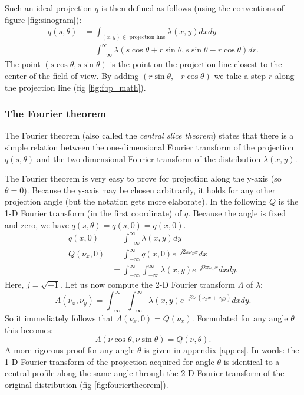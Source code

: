 \documentclass[11pt,oneside]{book}
\begin{document}
Such an ideal projection $q$ is then defined as follows (using the conventions
of figure \ref{fig:sinogram}):
\begin{align}
q(s, \theta) &= \int_{(x,y) \in \; \mbox{projection line}}
                  \lambda(x,y) dx dy\\
             &= \int_{-\infty}^{\infty}
        \lambda(s \cos \theta + r \sin \theta,
                s \sin \theta - r \cos \theta) dr. \label{eq:jnidealproj}
\end{align}
The point $(s \cos \theta, s \sin \theta)$ is the point on the projection line
closest to the center of the field of view.  By adding $(r \sin \theta, - r
\cos \theta)$ we take a step $r$ along the projection line (fig
\ref{fig:fbp_math}).


\subsubsection{The Fourier theorem}
The Fourier theorem (also called the {\em central slice theorem})
states that there is a simple relation between the one-dimensional
Fourier transform of the projection $q(s, \theta)$ and the
two-dimensional Fourier transform of the distribution $\lambda(x,y)$.

The Fourier theorem is very easy to prove for projection along the y-axis (so
$\theta = 0$). Because the y-axis may be chosen arbitrarily, it holds for
any other projection angle (but the notation gets more elaborate).
In the following $Q$ is the 1-D Fourier transform (in the first coordinate) of
$q$. Because the angle is fixed and zero, we have
$q(s, \theta) = q(s, 0) = q(x,0)$.
\begin{align}
  q(x,0) &= \int_{-\infty}^{\infty} \lambda(x,y) dy \\
  Q(\nu_x,0) &= \int_{-\infty}^{\infty}  q(x,0) e^{-j2\pi \nu_x x} dx \\
          &= \int_{-\infty}^{\infty}  \int_{-\infty}^{\infty}
                 \lambda(x,y) e^{-j2\pi \nu_x x} dx dy.
\end{align}
Here, $j = \sqrt{-1}$. Let us now compute the 2-D Fourier transform
$\Lambda$ of $\lambda$:
\begin{equation}
\Lambda(\nu_x, \nu_y)  =   \int_{-\infty}^{\infty}  \int_{-\infty}^{\infty}
         \lambda(x,y) e^{-j2\pi (\nu_x x + \nu_y y)} dx dy.
\end{equation}
So it immediately follows that $\Lambda(\nu_x, 0) = Q(\nu_x)$.
Formulated for any angle $\theta$ this becomes:
\begin{equation}
  \Lambda(\nu \cos \theta, \nu \sin \theta) = Q(\nu, \theta). 
  \label{fouriertheorem}
\end{equation}
A more rigorous proof for any angle $\theta$ is given in appendix
\ref{app:cs}.  In words: the 1-D Fourier transform of the projection
acquired for angle $\theta$ is identical to a central profile along
the same angle through the 2-D Fourier transform of the original
distribution (fig \ref{fig:fouriertheorem}).
\end{document}
